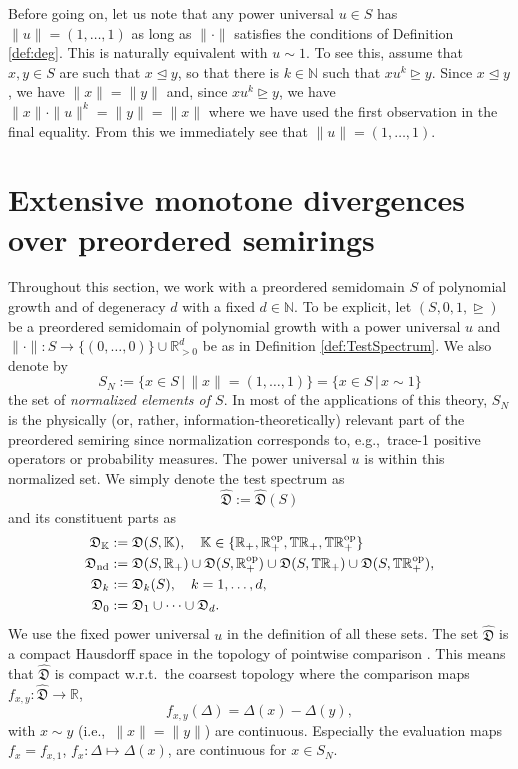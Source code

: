 \documentclass[12pt,a4paper,reqno]{amsart}
\newcommand{\rleq}{\trianglelefteq}
\newcommand{\rgeq}{\trianglerighteq}
\theoremstyle{definition}
\newcommand{\mf}[1]{\mathfrak{#1}}
\newcommand{\mb}[1]{\mathbb{#1}}
\newcommand{\N}{\mathbb N}
\newcommand{\R}{\mathbb R}
\newcommand{\T}{\mathbb T}
\begin{document}
Before going on, let us note that any power universal $u\in S$ has $\|u\|=(1,\ldots,1)$ as long as $\|\cdot\|$ satisfies the conditions of Definition \ref{def:deg}. This is naturally equivalent with $u\sim 1$. To see this, assume that $x,y\in S$ are such that $x\rleq y$, so that there is $k\in\N$ such that $xu^k\rgeq y$. Since $x\rleq y$, we have $\|x\|=\|y\|$ and, since $xu^k\rgeq y$, we have $\|x\|\cdot\|u\|^k=\|y\|=\|x\|$ where we have used the first observation in the final equality. From this we immediately see that $\|u\|=(1,\ldots,1)$.

\section{Extensive monotone divergences over preordered semirings}\label{sec:AddMonDiv}

Throughout this section, we work with a preordered semidomain $S$ of polynomial growth and of degeneracy $d$ with a fixed $d\in\N$. To be explicit, let $(S,0,1,\rgeq)$ be a preordered semidomain of polynomial growth with a power universal $u$ and $\|\cdot\|:S\to\{(0,\ldots,0)\}\cup\R_{>0}^d$ be as in Definition \ref{def:TestSpectrum}. We also denote by
$$
S_N:=\{x\in S\,|\,\|x\|=(1,\ldots,1)\}=\{x\in S\,|\,x\sim 1\}
$$
the set of {\it normalized elements of $S$}. In most of the applications of this theory, $S_N$ is the physically (or, rather, information-theoretically) relevant part of the preordered semiring since normalization corresponds to, e.g.,\ trace-1 positive operators or probability measures. The power universal $u$ is within this normalized set. We simply denote the test spectrum as
$$
\hat{\mf D}:=\hat{\mf D}(S)
$$
and its constituent parts as
\begin{align*}
\mf D_{\mb K}&:=\mf D(S,\mb K),\quad\mb K\in\{\R_+,\R_+^{\rm op},\T\R_+,\T\R_+^{\rm op}\}\\
\mf D_{\rm nd}&:=\mf D(S,\R_+)\cup\mf D(S,\R_+^{\rm op})\cup\mf D(S,\T\R_+)\cup\mf D(S,\T\R_+^{\rm op}),\\
\mf D_k&:=\mf D_k(S),\quad k=1,\ldots,d,\\
\mf D_0&:=\mf D_1\cup\cdots\cup\mf D_d.
\end{align*}
We use the fixed power universal $u$ in the definition of all these sets. The set $\hat{\mf D}$ is a compact Hausdorff space in the topology of pointwise comparison \cite[Proposition 8.5]{FritzII}. This means that $\hat{\mf D}$ is compact w.r.t.\ the coarsest topology where the comparison maps $f_{x,y}:\hat{\mf D}\to\R$,
\begin{equation}\label{eq:comparisonmaps}
f_{x,y}(\Delta)=\Delta(x)-\Delta(y),
\end{equation}
with $x\sim y$ (i.e.,\ $\|x\|=\|y\|$) are continuous. Especially the evaluation maps $f_x=f_{x,1}$, $f_x:\Delta\mapsto\Delta(x)$, are continuous for $x\in S_N$.
\end{document}

